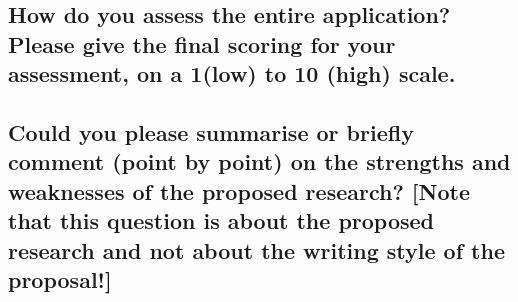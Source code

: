 \subsection*{How do you assess the entire application? Please give the final scoring for your assessment, on a 1(low) to 10 (high) scale.}

\subsection*{Could you please summarise or briefly comment (point by point) on the strengths and weaknesses of the proposed research? [Note that this question is about the proposed research and not about the writing style of the proposal!]}
